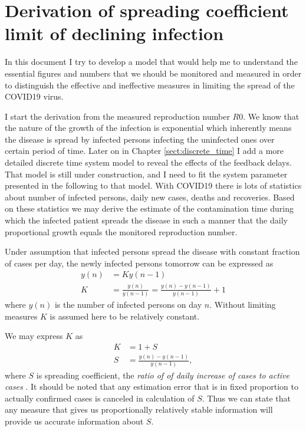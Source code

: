 \chapter{Derivation of spreading coefficient limit of declining infection}\label{chap:principles}

In this document I try to develop a model that would help me to understand the
essential figures and numbers that we should be monitored and measured in order to 
distinguish the effective and ineffective measures in limiting the spread of
the COVID19 virus.

I start the derivation from the measured reproduction number $R0$. We know that
the nature of the growth of the infection is exponential which inherently
means the disease is spread by infected persons infecting the uninfected ones
over certain period of time. Later on in Chapter \ref{sect:discrete_time} I add a more detailed discrete time
system model to reveal the effects of the feedback delays. That model is still
under construction, and I need to fit the system parameter presented in the
following to that model.
With COVID19 there is lots of statistics about number of
infected persons, daily new cases, deaths and recoveries. Based on these
statistics we may derive the estimate of the contamination time during which
the infected patient spreads the disease in such a manner that the daily
proportional growth equals the monitored reproduction number.

Under assumption that infected persons spread the disease with constant
fraction of cases per day, the newly infected persons tomorrow can be
expressed as
\begin{align}
    y\left(n\right)&=K y\left(n-1\right)\\
    K&= \frac{y\left(n\right)}{y\left(n-1\right)}=
    \frac{y\left(n\right)-y\left(n-1\right)}{y\left(n-1\right)}+1
\end{align}
where $y\left(n\right)$ is the number of infected persons on day $n$. Without
limiting measures $K$ is assumed here to be relatively constant. 

We may express $K$ as
\begin{align}
    K&= 1+S\\
    S &= \frac{y\left(n\right)-y\left(n-1\right)}{y\left(n-1\right)},
\end{align}
where $S$ is spreading coefficient, the \emph{ ratio of of daily increase of
    cases  to
active cases }. It should be noted that any estimation error that is in fixed
proportion to actually confirmed cases is canceled in calculation of $S$. Thus
we can state that any measure that gives us proportionally relatively stable
information will provide us accurate information about $S$.

